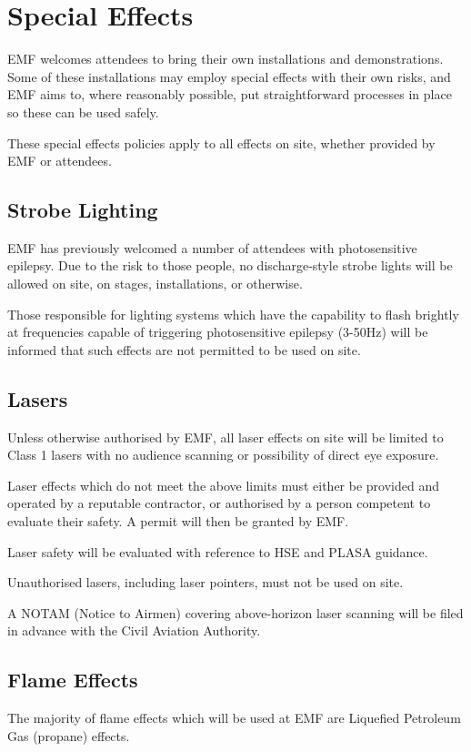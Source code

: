 \section{Special Effects}
EMF welcomes attendees to bring their own installations and demonstrations.
Some of these installations may employ special effects with their own risks,
and EMF aims to, where reasonably possible, put straightforward processes in
place so these can be used safely.

These special effects policies apply to all effects on site, whether provided
by EMF or attendees.

\subsection{Strobe Lighting}
EMF has previously welcomed a number of attendees with photosensitive epilepsy.
Due to the risk to those people, no discharge-style strobe lights will be allowed
on site, on stages, installations, or otherwise.

Those responsible for lighting systems which have the capability to flash brightly
at frequencies capable of triggering photosensitive epilepsy (3-50Hz) will be
informed that such effects are not permitted to be used on site.

\subsection{Lasers}\label{lasers}
Unless otherwise authorised by EMF, all laser effects on site will be limited to
Class 1 lasers with no audience scanning or possibility of direct eye exposure.

Laser effects which do not meet the above limits must either be provided and
operated by a reputable contractor, or authorised by a person competent to
evaluate their safety. A permit will then be granted by EMF.

Laser safety will be evaluated with reference to HSE \cite{hselaser} and
PLASA \cite{plasalaser} guidance.

Unauthorised lasers, including laser pointers, must not be used on site.

A NOTAM (Notice to Airmen) covering above-horizon laser scanning will be filed
in advance with the Civil Aviation Authority.

\subsection{Flame Effects}\label{flameeffects}
The majority of flame effects which will be used at EMF are Liquefied Petroleum
Gas (propane) effects.

